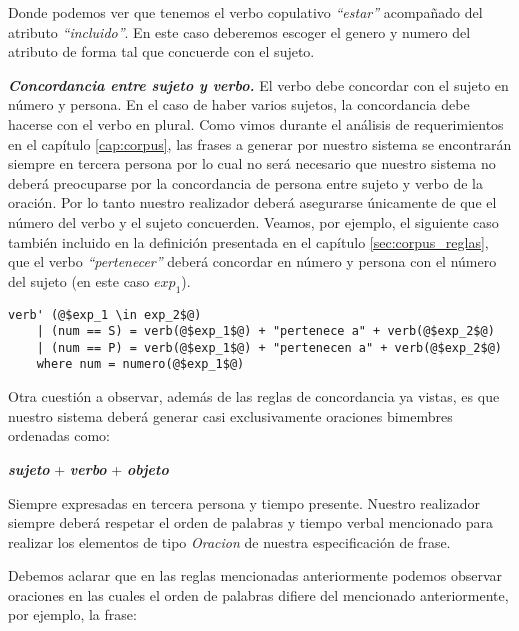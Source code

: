 \noindent
Donde podemos ver que tenemos el verbo copulativo \emph{``estar''} acompañado del atributo \emph{``incluido''}. En este caso deberemos escoger el genero y numero del atributo de forma tal que concuerde con el sujeto.

\medskip
\noindent
\textbf{\emph{Concordancia entre sujeto y verbo.}} El verbo debe concordar con el sujeto en número y persona. En el caso de haber varios sujetos, la concordancia debe hacerse con el verbo en plural. Como vimos durante el análisis de requerimientos en el capítulo \ref{cap:corpus}, las frases a generar por nuestro sistema se encontrarán siempre en tercera persona por lo cual no será necesario que nuestro sistema no deberá preocuparse por la concordancia de persona entre sujeto y verbo de la oración. Por lo tanto nuestro realizador deberá asegurarse únicamente de que el número del verbo y el sujeto concuerden.
\noindent
Veamos, por ejemplo, el siguiente caso también incluido en la definición presentada en el capítulo \ref{sec:corpus_reglas}, que el verbo \emph{``pertenecer''} deberá concordar en número y persona con el número del sujeto (en este caso $exp_1$). 

\begin{mdframed}[style=codebox]
\begin{verbatim}
verb' (@$exp_1 \in exp_2$@)
    | (num == S) = verb(@$exp_1$@) + "pertenece a" + verb(@$exp_2$@) 
    | (num == P) = verb(@$exp_1$@) + "pertenecen a" + verb(@$exp_2$@) 
    where num = numero(@$exp_1$@)
\end{verbatim}
\end{mdframed}

\bigskip
Otra cuestión a observar, además de las reglas de concordancia ya vistas, es que nuestro sistema deberá generar casi exclusivamente oraciones bimembres ordenadas como:

\begin{center}
\emph{\textbf{sujeto}} + \emph{\textbf{verbo}} + \emph{\textbf{objeto}}
\end{center}

Siempre expresadas en tercera persona y tiempo presente. Nuestro realizador siempre deberá respetar el orden de palabras y tiempo verbal mencionado para realizar los elementos de tipo \emph{Oracion} de nuestra especificación de frase. 

Debemos aclarar que en las reglas mencionadas anteriormente podemos observar oraciones en las cuales el orden de palabras difiere del mencionado anteriormente, por ejemplo, la frase:

